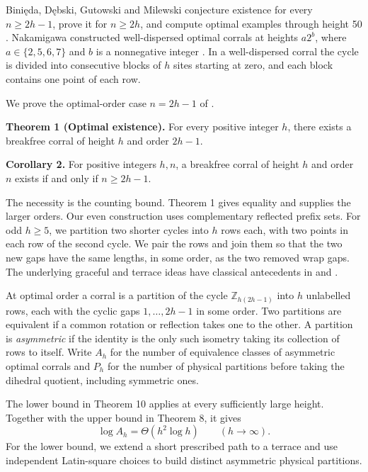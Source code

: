 \documentclass[11pt,a4paper]{article}
\newcommand{\statementstart}{\par\addvspace{6pt plus 1pt minus 1pt}\noindent}
\begin{document}
Binięda, Dębski, Gutowski and Milewski conjecture existence for every \(n\geq2h-1\), prove it for \(n\geq2h\), and compute optimal examples through height 50 \cite{BDGM26}. Nakamigawa constructed well-dispersed optimal corrals at heights \(a2^b\), where \(a\in\{2,5,6,7\}\) and \(b\) is a nonnegative integer \cite{Nak15}. In a well-dispersed corral the cycle is divided into consecutive blocks of \(h\) sites starting at zero, and each block contains one point of each row.

We prove the optimal-order case \(n=2h-1\) of \cite[Conjecture 1]{BDGM26}.

\statementstart\textbf{Theorem 1 (Optimal existence).} For every positive integer \(h\), there exists a breakfree corral of height \(h\) and order \(2h-1\).

\statementstart\textbf{Corollary 2.} For positive integers \(h,n\), a breakfree corral of height \(h\) and order \(n\) exists if and only if \(n\geq2h-1\).

The necessity is the counting bound. Theorem 1 gives equality and \cite[Theorem 3]{BDGM26} supplies the larger orders. Our even construction uses complementary reflected prefix sets. For odd \(h\geq5\), we partition two shorter cycles into \(h\) rows each, with two points in each row of the second cycle. We pair the rows and join them so that the two new gaps have the same lengths, in some order, as the two removed wrap gaps. The underlying graceful and terrace ideas have classical antecedents in \cite{HOS19} and \cite{OW11}.

\begin{samepage} At optimal order a corral is a partition of the cycle \(\mathbb Z_{h(2h-1)}\) into \(h\) unlabelled rows, each with the cyclic gaps \(1,\ldots,2h-1\) in some order. Two partitions are equivalent if a common rotation or reflection takes one to the other. A partition is \emph{asymmetric} if the identity is the only such isometry taking its collection of rows to itself. Write \(A_h\) for the number of equivalence classes of asymmetric optimal corrals and \(P_h\) for the number of physical partitions before taking the dihedral quotient, including symmetric ones. \par\end{samepage}

The lower bound in Theorem 10 applies at every sufficiently large height. Together with the upper bound in Theorem 8, it gives \[
 \log A_h=\Theta(h^2\log h)\qquad(h\to\infty).
\] For the lower bound, we extend a short prescribed path to a terrace and use independent Latin-square choices to build distinct asymmetric physical partitions.
\end{document}
